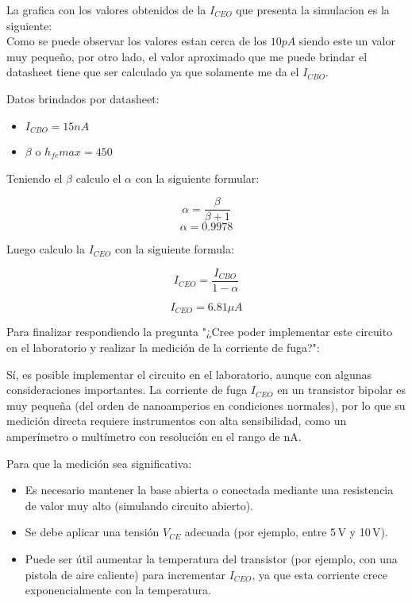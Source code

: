

  La grafica con los valores obtenidos de la $I_{CEO}$ que presenta la simulacion es la siguiente:\\


  Como se puede observar los valores estan cerca de los $10pA$ siendo este un valor muy pequeño, por otro lado, el valor aproximado que me puede brindar el datasheet tiene que ser calculado ya que solamente me da el $I_{CBO}$.


  Datos brindados por datasheet:

  \begin{itemize}
      \item $I_{CBO}=15nA$
      \item $\beta$ o $h_{fe}max=450$
  \end{itemize}

  Teniendo el $\beta$ calculo el $\alpha$ con la siguiente formular:


    
    \begin{center}

        \[
        \alpha=\frac{\beta}{\beta+1}
        \]
        \[
        \alpha=0.9978
        \]
        
    \end{center}


    Luego calculo la $I_{CEO}$ con la siguiente formula:


    \begin{center}
        \[
        I_{CEO}=\frac{I_{CBO}}{1-\alpha}
        \]

        \[
        I_{CEO}= 6.81\mu A
        \]
           
    \end{center}

  Para finalizar respondiendo la pregunta "¿Cree poder implementar este circuito en el laboratorio y
realizar la medición de la corriente de fuga?":

    Sí, es posible implementar el circuito en el laboratorio, aunque con algunas consideraciones importantes. La corriente de fuga $I_{CEO}$ en un transistor bipolar es muy pequeña (del orden de nanoamperios en condiciones normales), por lo que su medición directa requiere instrumentos con alta sensibilidad, como un amperímetro o multímetro con resolución en el rango de nA.
    
    Para que la medición sea significativa:
    
    \begin{itemize}
        \item Es necesario mantener la base abierta o conectada mediante una resistencia de valor muy alto (simulando circuito abierto).
        \item Se debe aplicar una tensión $V_{CE}$ adecuada (por ejemplo, entre 5\,V y 10\,V).
        \item Puede ser útil aumentar la temperatura del transistor (por ejemplo, con una pistola de aire caliente) para incrementar $I_{CEO}$, ya que esta corriente crece exponencialmente con la temperatura.
    \end{itemize}
    
